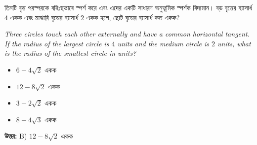 \documentclass[12pt, a4paper]{article}
\begin{document}
\begin{tcolorbox}[questionbox={প্রশ্ন (Question) 1}]
    \noindent
    তিনটি বৃত্ত পরস্পরকে বহিঃস্থভাবে স্পর্শ করে এবং এদের একটি সাধারণ অনুভূমিক স্পর্শক বিদ্যমান। বড় বৃত্তের ব্যাসার্ধ $4$ একক এবং মাঝারি বৃত্তের ব্যাসার্ধ $2$ একক হলে, ছোট বৃত্তের ব্যাসার্ধ কত একক?
    
    \vspace{0.8em}
    \begin{english}
    \noindent\textit{\color{darkgray}
    Three circles touch each other externally and have a common horizontal tangent. If the radius of the largest circle is $4$ units and the medium circle is $2$ units, what is the radius of the smallest circle in units?
    }
    \end{english}
\end{tcolorbox}

\vspace{1em}
\begin{itemize}[label={}, leftmargin=1cm, itemsep=0.5em]
    \item[\textbf{A)}] $6 - 4\sqrt{2}$ একক
    \item[\textbf{B)}] $12 - 8\sqrt{2}$ একক
    \item[\textbf{C)}] $3 - 2\sqrt{2}$ একক
    \item[\textbf{D)}] $8 - 4\sqrt{3}$ একক
\end{itemize}

\vspace{0.5em}
\begin{tcolorbox}[answerbox]
    \textbf{\color{success} উত্তর:} B) $12 - 8\sqrt{2}$ একক
\end{tcolorbox}
\vspace{1em}
\end{document}
